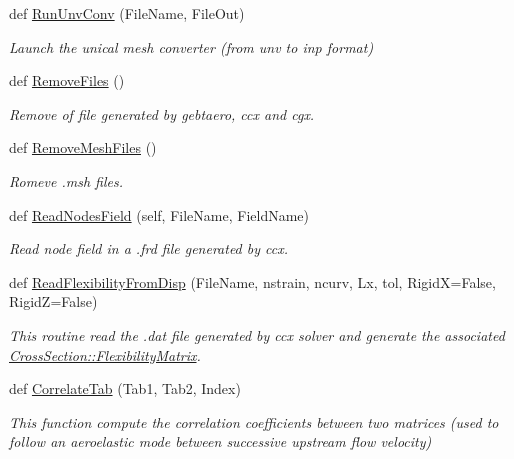 \begin{DoxyCompactItemize}
def \hyperlink{namespacegebtaero_1_1utils_ae04f5967428b15a9dc2971f6a2396938}{Run\+Unv\+Conv} (File\+Name, File\+Out)
\begin{DoxyCompactList}\small\item\em Launch the unical mesh converter (from unv to inp format) \end{DoxyCompactList}\item 
def \hyperlink{namespacegebtaero_1_1utils_a14f397a623bb26fcf8b4dcd64228aa05}{Remove\+Files} ()
\begin{DoxyCompactList}\small\item\em Remove of file generated by gebtaero, ccx and cgx. \end{DoxyCompactList}\item 
def \hyperlink{namespacegebtaero_1_1utils_a8f7dd7932f9ad411a1b153e1e17a4c62}{Remove\+Mesh\+Files} ()
\begin{DoxyCompactList}\small\item\em Romeve .msh files. \end{DoxyCompactList}\item 
def \hyperlink{namespacegebtaero_1_1utils_a09e606c50b30d67220853c2340124990}{Read\+Nodes\+Field} (self, File\+Name, Field\+Name)
\begin{DoxyCompactList}\small\item\em Read node field in a .frd file generated by ccx. \end{DoxyCompactList}\item 
def \hyperlink{namespacegebtaero_1_1utils_a2bc8449983854bcc37d204283f55c599}{Read\+Flexibility\+From\+Disp} (File\+Name, nstrain, ncurv, Lx, tol, RigidX=False, RigidZ=False)
\begin{DoxyCompactList}\small\item\em This routine read the .dat file generated by ccx solver and generate the associated \hyperlink{classgebtaero_1_1_cross_section_1_1_cross_section_ac20eafaf38ff757f9a8c9ae89212396a}{Cross\+Section\+::\+Flexibility\+Matrix}. \end{DoxyCompactList}\item 
def \hyperlink{namespacegebtaero_1_1utils_a49dfe8af29c3ae64bc75195f0a88a1ce}{Correlate\+Tab} (Tab1, Tab2, Index)
\begin{DoxyCompactList}\small\item\em This function compute the correlation coefficients between two matrices (used to follow an aeroelastic mode between successive upstream flow velocity) \end{DoxyCompactList}\item 

\end{DoxyCompactItemize}

